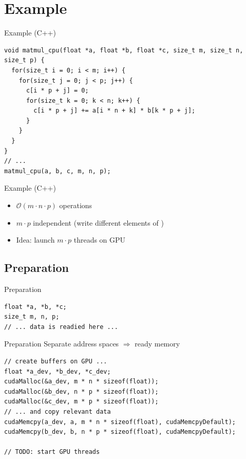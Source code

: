 \section{Example}\label{sec:example}
\mkAgenda

\begin{frame}[fragile]{Example (C++)}
    \center
    \begin{verbatim}
void matmul_cpu(float *a, float *b, float *c, size_t m, size_t n, size_t p) {
  for(size_t i = 0; i < m; i++) {
    for(size_t j = 0; j < p; j++) {
      c[i * p + j] = 0;
      for(size_t k = 0; k < n; k++) {
        c[i * p + j] += a[i * n + k] * b[k * p + j];
      }
    }
  }
}
// ...
matmul_cpu(a, b, c, m, n, p);
    \end{verbatim}
\end{frame}

\begin{frame}[fragile]{Example (C++)}
    \center
    \begin{itemize}
        \item<1-> $\mathcal{O}(m \cdot n \cdot p)$ operations
        \item<2-> $m \cdot p$ independent (write different elements of )
        \item<3-> Idea: launch $m \cdot p$ threads on GPU
    \end{itemize}
\end{frame}

\subsection{Preparation}\label{subsec:preparation}
\begin{frame}[fragile]{Preparation}
    \center
    \begin{verbatim}
float *a, *b, *c;
size_t m, n, p;
// ... data is readied here ...
    \end{verbatim}
\end{frame}

\begin{frame}[fragile]{Preparation}
    \center
    Separate address spaces $\Rightarrow$ ready memory
    \begin{verbatim}
// create buffers on GPU ...
float *a_dev, *b_dev, *c_dev;
cudaMalloc(&a_dev, m * n * sizeof(float));
cudaMalloc(&b_dev, n * p * sizeof(float));
cudaMalloc(&c_dev, m * p * sizeof(float));
// ... and copy relevant data
cudaMemcpy(a_dev, a, m * n * sizeof(float), cudaMemcpyDefault);
cudaMemcpy(b_dev, b, n * p * sizeof(float), cudaMemcpyDefault);

// TODO: start GPU threads
    \end{verbatim}
\end{frame}


